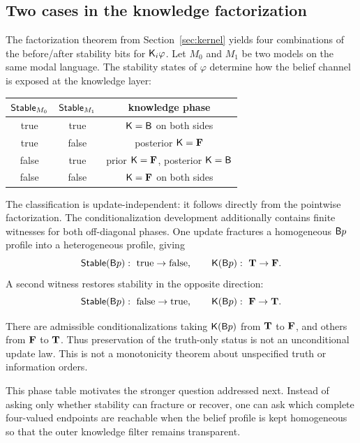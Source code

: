 \subsection{Two cases in the knowledge factorization}

The factorization theorem from Section~\ref{sec:kernel} yields four combinations of the before/after stability bits for \(\mathsf{K}_i\varphi\). Let \(M_0\) and \(M_1\) be two models on the same modal language. The stability states of \(\varphi\) determine how the belief channel is exposed at the knowledge layer:

\begin{center}
\begin{tabular}{ccc}
\toprule
\(\mathsf{Stable}_{M_0}\) & \(\mathsf{Stable}_{M_1}\) & knowledge phase \\
\midrule
true & true & \(\mathsf{K}=\mathsf{B}\) on both sides \\
true & false & posterior \(\mathsf{K}=\mathbf{F}\) \\
false & true & prior \(\mathsf{K}=\mathbf{F}\), posterior \(\mathsf{K}=\mathsf{B}\) \\
false & false & \(\mathsf{K}=\mathbf{F}\) on both sides \\
\bottomrule
\end{tabular}
\end{center}

The classification is update-independent: it follows directly from the pointwise factorization. The conditionalization development additionally contains finite witnesses for both off-diagonal phases. One update fractures a homogeneous \(\mathsf{B} p\) profile into a heterogeneous profile, giving
\[
  \mathsf{Stable}(\mathsf{B} p):\ \text{true}\to\text{false},
  \qquad
  \mathsf{K}(\mathsf{B} p):\ \mathbf{T}\to\mathbf{F}.
\]
A second witness restores stability in the opposite direction:
\[
  \mathsf{Stable}(\mathsf{B} p):\ \text{false}\to\text{true},
  \qquad
  \mathsf{K}(\mathsf{B} p):\ \mathbf{F}\to\mathbf{T}.
\]

\begin{corollary}
There are admissible conditionalizations taking \(\mathsf{K}(\mathsf{B} p)\) from \(\mathbf{T}\) to \(\mathbf{F}\), and others from \(\mathbf{F}\) to \(\mathbf{T}\). Thus preservation of the truth-only status is not an unconditional update law. This is not a monotonicity theorem about unspecified truth or information orders.
\statuswitness
\end{corollary}

This phase table motivates the stronger question addressed next. Instead of asking only whether stability can fracture or recover, one can ask which complete four-valued endpoints are reachable when the belief profile is kept homogeneous so that the outer knowledge filter remains transparent.

